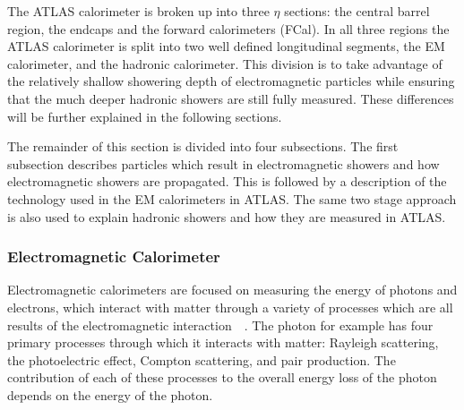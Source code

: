 The ATLAS calorimeter is broken up into three $\eta$ sections: the central barrel region, the endcaps and the forward calorimeters (FCal).  
In all three regions the ATLAS calorimeter is split into two well defined longitudinal segments, the \gls{EM} calorimeter, and the hadronic calorimeter.   
This division is to take advantage of the relatively shallow showering depth of electromagnetic particles while ensuring that the much deeper hadronic showers are still fully measured.  
These differences will be further explained in the following sections.  

The remainder of this section is divided into four subsections.  
The first subsection describes particles which result in electromagnetic showers and how electromagnetic showers are propagated.  
This is followed by a description of the technology used in the EM calorimeters in ATLAS.  
The same two stage approach is also used to explain hadronic showers and how they are measured in ATLAS.  

\subsubsection{Electromagnetic Calorimeter}
\label{EMCalo} 

Electromagnetic calorimeters are focused on measuring the energy of photons and electrons, which interact with matter through a variety of processes which are all results of the electromagnetic interaction~\cite{grupen2008particle}~\cite{Wigmans2008}.  
The photon for example has four primary processes through which it interacts with matter: Rayleigh scattering, the photoelectric effect, Compton scattering, and pair production.  
The contribution of each of these processes to the overall energy loss of the photon depends on the energy of the photon.  

